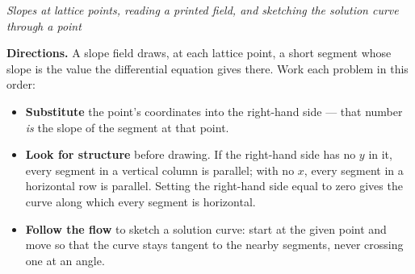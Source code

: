 \documentclass[12pt]{article}
\begin{document}

\begin{center}
\textit{Slopes at lattice points, reading a printed field, and sketching the
solution curve through a point}
\end{center}

\noindent\textbf{Directions.} A slope field draws, at each lattice point, a
short segment whose slope is the value the differential equation gives there.
Work each problem in this order:
\begin{itemize}[leftmargin=1.2cm, itemsep=2pt, topsep=2pt]
\item \textbf{Substitute} the point's coordinates into the right-hand side ---
that number \emph{is} the slope of the segment at that point.
\item \textbf{Look for structure} before drawing. If the right-hand side has no
$y$ in it, every segment in a vertical column is parallel; with no $x$, every
segment in a horizontal row is parallel. Setting the right-hand side equal to
zero gives the curve along which every segment is horizontal.
\item \textbf{Follow the flow} to sketch a solution curve: start at the given
point and move so that the curve stays tangent to the nearby segments, never
crossing one at an angle.
\end{itemize}

\end{document}
